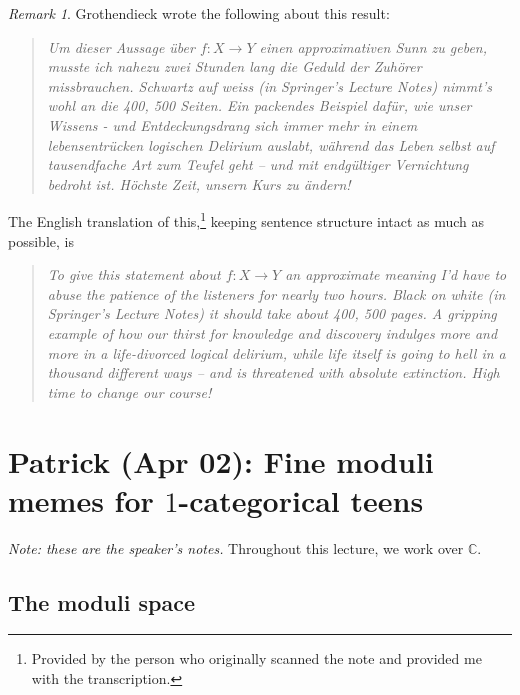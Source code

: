 \documentclass[leqno, openany]{memoir}
\theoremstyle{definition}
\theoremstyle{remark}
\newtheorem{rmk}[thm]{Remark}
\theoremstyle{plain}
\theoremstyle{definition}
\theoremstyle{remark}
\newcommand{\C}{\mathbb{C}}
\begin{document}
\begin{rmk}
    Grothendieck wrote the following about this result:
    \begin{quotation}
        \textit{Um dieser Aussage \"uber $f \colon X \to Y$ einen approximativen Sunn zu geben, musste ich nahezu zwei Stunden lang die Geduld der Zuh\"orer missbrauchen. Schwartz auf weiss (in Springer's Lecture Notes) nimmt's wohl an die 400, 500 Seiten. Ein packendes Beispiel daf\"ur, wie unser Wissens - und Entdeckungsdrang sich immer mehr in einem lebensentr\"ucken logischen Delirium auslabt, w\"ahrend das Leben selbst auf tausendfache Art zum Teufel geht -- und mit endg\"ultiger Vernichtung bedroht ist. H\"ochste Zeit, unsern Kurs zu \"andern!} 
    \end{quotation}
    The English translation of this,\footnote{Provided by the person who originally scanned the note and provided me with the transcription.} keeping sentence structure intact as much as possible, is
    \begin{quotation}
        \textit{To give this statement about $f \colon X \to Y$ an approximate meaning I'd have to abuse the patience of the listeners for nearly two hours. Black on white (in Springer's Lecture Notes) it should take about 400, 500 pages. A gripping example of how our thirst for knowledge and discovery indulges more and more in a life-divorced logical delirium, while life itself is going to hell in a thousand different ways -- and is threatened with absolute extinction. High time to change our course!} 
    \end{quotation}
\end{rmk}

\chapter{Patrick (Apr 02): Fine moduli memes for $1$-categorical teens}%
\label{cha:patrick_apr_02_}

\textit{Note: these are the speaker's notes.} Throughout this lecture, we work over $\C$.

\section{The moduli space}%
\label{sec:the_moduli_space}
\end{document}
